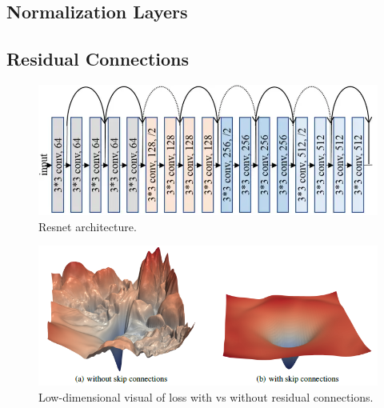\documentclass{article}
\begin{document}
  \subsection{Normalization Layers} 



  \subsection{Residual Connections} 

    \begin{figure}[H]
      \centering 
      \includegraphics[scale=0.4]{img/02_Control/resnet_arch.png}
      \caption{Resnet architecture. } 
      \label{fig:resnet_arch}
    \end{figure}

    \begin{figure}[H]
      \centering 
      \includegraphics[scale=0.4]{img/02_Control/resnet_loss.png}
      \caption{Low-dimensional visual of loss with vs without residual connections. } 
      \label{fig:resnet_loss}
    \end{figure}
\end{document}

